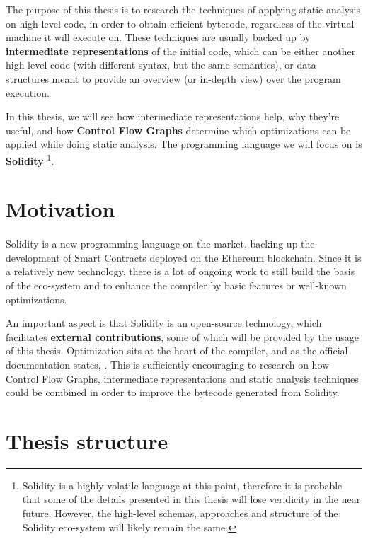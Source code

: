 The purpose of this thesis is to research the techniques of applying static analysis on high level code, in order to obtain efficient bytecode, regardless of the virtual machine it will execute on. These techniques are usually backed up by \textbf{intermediate representations} of the initial code, which can be either another high level code (with different syntax, but the same semantics), or data structures meant to provide an overview (or in-depth view) over the program execution.

In this thesis, we will see how intermediate representations help, why they're useful, and how \textbf{Control Flow Graphs} determine which optimizations can be applied while doing static analysis. The programming language we will focus on is \textbf{Solidity} \footnote[1]{Solidity is a highly volatile language at this point, therefore it is probable that some of the details presented in this thesis will lose veridicity in the near future. However, the high-level schemas, approaches and structure of the Solidity eco-system will likely remain the same.}.

\section{Motivation}

\paragraph*{}
Solidity is a new programming language on the market, backing up the development of Smart Contracts deployed on the Ethereum blockchain. Since it is a relatively new technology, there is a lot of ongoing work to still build the basis of the eco-system and to enhance the compiler by basic features or well-known optimizations.

An important aspect is that Solidity is an open-source technology, which facilitates \textbf{external contributions}, some of which will be provided by the usage of this thesis. Optimization sits at the heart of the compiler, and as the official documentation states, \cite[the optimizer is under heavy development]{solidity-optimizer}. This is sufficiently encouraging to research on how Control Flow Graphs, intermediate representations and static analysis techniques could be combined in order to improve the bytecode generated from Solidity.

\section{Thesis structure}

